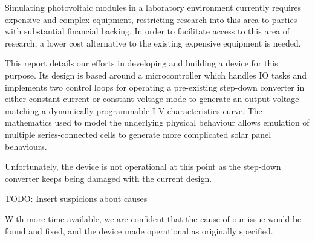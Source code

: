 

Simulating  photovoltaic modules in a laboratory environment currently  requires
expensive and complex equipment,  restricting research into this area to parties
with substantial financial backing.
In order to facilitate access to this area of research, a lower cost alternative
to the existing expensive equipment is needed.

This  report details our efforts in developing and building a  device  for  this
purpose. Its design is based around a microcontroller which handles IO tasks and
implements two control loops for operating a pre-existing step-down converter in
either constant  current  or constant voltage mode to generate an output voltage
matching  a  dynamically programmable I-V characteristics curve. The  mathematics
used to  model  the  underlying  physical behaviour allows emulation of multiple
series-connected  cells to generate more  complicated  solar  panel  behaviours.

Unfortunately, the  device is not operational  at this point as  the step-down
converter keeps being damaged with the current design.

TODO: Insert suspicions about causes

With more time available,  we are confident that the cause  of our issue would
be found and fixed, and the device made operational as originally specified.
